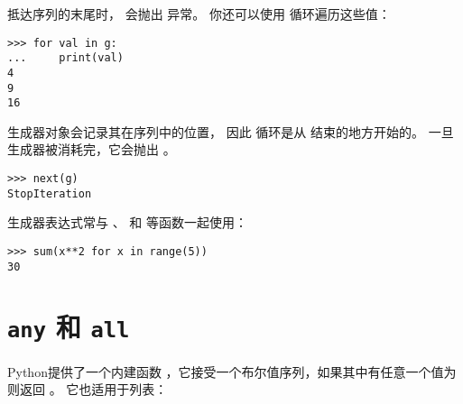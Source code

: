 
抵达序列的末尾时，  会抛出  异常。
你还可以使用  循环遍历这些值：


\begin{lstlisting}
>>> for val in g:
...     print(val)
4
9
16
\end{lstlisting}


生成器对象会记录其在序列中的位置， 因此  循环是从  结束的地方开始的。  一旦生成器被消耗完，它会抛出  。

\begin{lstlisting}
>>> next(g)
StopIteration
\end{lstlisting}


生成器表达式常与  、  和  等函数一起使用：


\begin{lstlisting}
>>> sum(x**2 for x in range(5))
30
\end{lstlisting}

\section{{\tt any} 和 {\tt all}}


Python提供了一个内建函数 ，它接受一个布尔值序列，如果其中有任意一个值为  则返回 。  它也适用于列表：

